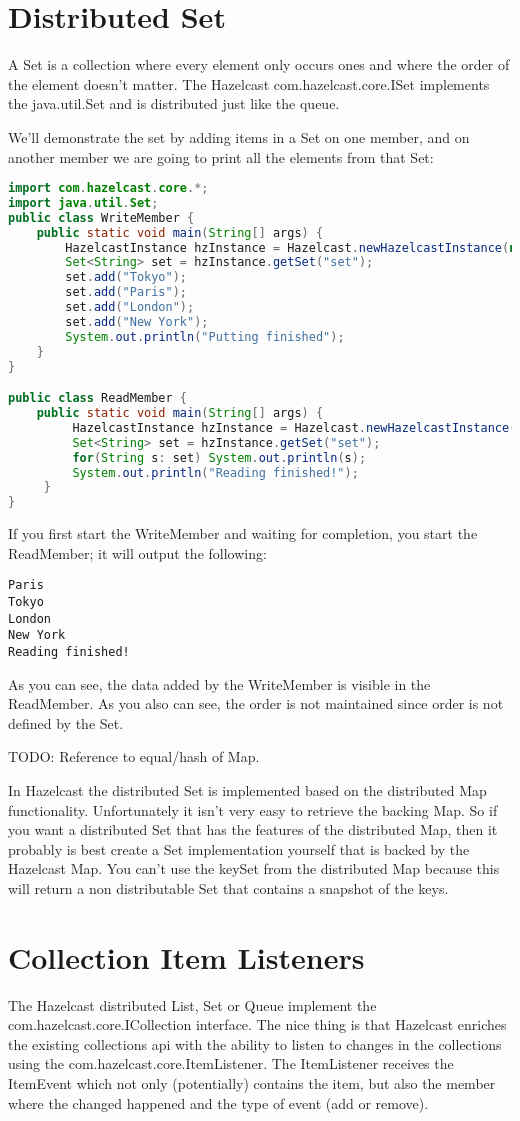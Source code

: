 \section{Distributed Set}
A Set is a collection where every element only occurs ones and where the order of the element doesn't matter. The Hazelcast com.hazelcast.core.ISet implements the java.util.Set and is distributed just like the queue.

We'll demonstrate the set by adding items in a Set on one member, and on another member we are going to print all the elements from that Set:
\begin{lstlisting}[language=java]
import com.hazelcast.core.*;
import java.util.Set;
public class WriteMember {
    public static void main(String[] args) {
        HazelcastInstance hzInstance = Hazelcast.newHazelcastInstance(null);
        Set<String> set = hzInstance.getSet("set");
        set.add("Tokyo");
        set.add("Paris");
        set.add("London");
        set.add("New York");
        System.out.println("Putting finished");
    }
}

public class ReadMember {
    public static void main(String[] args) {
         HazelcastInstance hzInstance = Hazelcast.newHazelcastInstance(null);
         Set<String> set = hzInstance.getSet("set");
         for(String s: set) System.out.println(s);
         System.out.println("Reading finished!");
     }
}
\end{lstlisting}
If you first start the WriteMember and waiting for completion, you start the ReadMember; it will output the following:
\begin{lstlisting}
Paris
Tokyo
London
New York
Reading finished!	
\end{lstlisting}
As you can see, the data added by the WriteMember is visible in the ReadMember. As you also can see, the order is not maintained since order is not defined by the Set.

TODO: Reference to equal/hash of Map.

In Hazelcast the distributed Set is implemented based on the distributed Map functionality. Unfortunately it isn't very easy to retrieve the backing Map. So if you want a distributed Set that has the features of the distributed Map, then it probably is best create a Set implementation yourself that is backed by the Hazelcast Map. You can't use the keySet from the distributed Map because this will return a non distributable Set that contains a snapshot of the keys.

\section{Collection Item Listeners}
The Hazelcast distributed List, Set or Queue implement the com.hazelcast.core.ICollection interface. The nice thing is that Hazelcast enriches the existing collections api with the ability to listen to changes in the collections using the com.hazelcast.core.ItemListener. The ItemListener receives the ItemEvent which not only (potentially) contains the item, but also the member where the changed happened and the type of event (add or remove).

